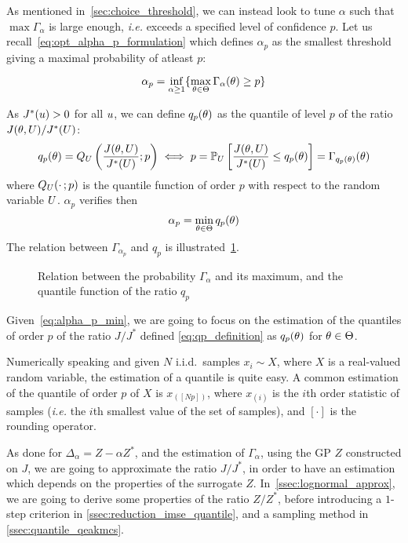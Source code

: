 \documentclass[../../Main_ManuscritThese.tex]{subfiles}
\newcommand\imgpath{/home/victor/acadwriting/Manuscrit/Text/Chapter4/img/}
\begin{document}
As mentioned in~\cref{sec:choice_threshold}, we can instead look to tune
$\alpha$ such that $\max \Gamma_{\alpha}$ is large enough, \emph{i.e.}
exceeds a specified level of confidence
$p$. %
Let us recall~\cref{eq:opt_alpha_p_formulation} which defines
$\alpha_p$ as the smallest threshold giving a maximal probability of
atleast $p$:

\begin{equation}
  \label{eq:alpha_p_inf_formation}
  \alpha_p = \inf_{\alpha \geq 1}\{\max_{\theta \in \Theta}\Gamma_{\alpha}(\theta)\geq p \}
\end{equation}

As $J^*(u) > 0$ for all $u$, we can define $q_{p}(\theta)$ as the quantile of level $p$ of the ratio $J(\theta, U) / J^*(U)$:
\begin{align}
  \label{eq:qp_definition}
       q_{p}(\theta)= Q_{U}\left(\frac{J(\theta, U)}{J^*(U)};p\right) \iff  p  = \mathbb{P}_{U}\left[\frac{J(\theta, U)}{J^*(U)} \leq q_{p}(\theta)\right] = \Gamma_{q_p(\theta)}(\theta)
\end{align}
where $Q_{U}(\cdot\,;p)$ is the quantile function of order $p$ with respect to the random variable $U$.
$\alpha_p$ verifies then
\begin{equation}
  \label{eq:alpha_p_min}
\alpha_p = \min_{\theta\in\Theta} q_p(\theta)
\end{equation}
The relation between $\Gamma_{\alpha_p}$ and $q_p$ is illustrated~\cref{fig:q_p_illu}.
\begin{figure}[ht]
  \centering
  
  \caption[Relation between $\Gamma_{\alpha}$ and $q_p$]{\label{fig:q_p_illu} Relation between the probability
    $\Gamma_{\alpha}$ and its maximum, and the quantile function of the
    ratio $q_p$}
\end{figure}

Given~\cref{eq:alpha_p_min}, we are going to focus on the estimation
of the quantiles of order $p$ of the ratio $J/J^*$
defined \cref{eq:qp_definition} as $q_p(\theta)$ for $\theta \in \Theta$.

Numerically speaking and given $N$ i.i.d.\ samples $x_i \sim X$, where
$X$ is a real-valued random variable, the estimation of a quantile is
quite easy. A common estimation of the quantile of order $p$ of $X$ is
$x_{(\left[Np\right])}$, where $x_{(i)}$ is the $i$th order statistic
of samples (\emph{i.e.} the $i$th smallest value of the set of
samples), and $[\cdot]$ is the rounding operator.

As done for $\Delta_{\alpha} = Z - \alpha Z^*$, and the estimation of
$\Gamma_{\alpha}$, using the GP $Z$ constructed on $J$, we are going
to approximate the ratio $J/J^*$, in order to have an estimation which
depends on the properties of the surrogate $Z$.
In~\cref{ssec:lognormal_approx}, we are going to derive some
properties of the ratio $Z/Z^*$, before introducing a $1$-step
criterion in \cref{ssec:reduction_imse_quantile}, and a sampling
method in \cref{ssec:quantile_qeakmcs}.
\end{document}
